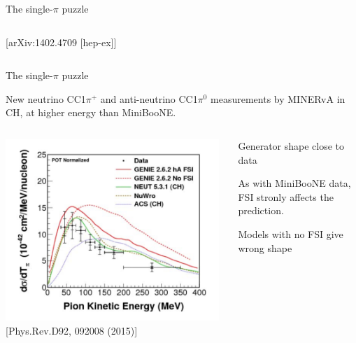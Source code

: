\begin{frame}{The single-$\pi$ puzzle}
\begin{columns}
\begin{column}{0.40\textwidth}
\begin{center}
         {\scriptsize [arXiv:1402.4709 [hep-ex]]}
      \end{center}
    \end{column}
  \end{columns}

\end{frame}

%
%
%
\begin{frame}{The single-$\pi$ puzzle}

{\small
  New neutrino CC1$\pi^{+}$ and anti-neutrino CC1$\pi^{0}$
  measurements by MINERvA in CH, at higher energy than MiniBooNE.\\
}
  \begin{columns}
    \begin{column}{0.50\textwidth}
      \begin{center}
         \includegraphics[width=0.98\textwidth]{./images/nuint/ccpi/minerva_cc1pi}\\
         {\scriptsize [Phys.Rev.D92, 092008 (2015)]}
      \end{center}
    \end{column}
    \begin{column}{0.50\textwidth}
      \begin{itemize}
        {\scriptsize
        \item Generator shape close to data
        \item As with MiniBooNE data, FSI stronly affects the prediction.
        \item Models with no FSI give wrong shape\\
}
\end{itemize}
\end{column}
\end{columns}
\end{frame}
